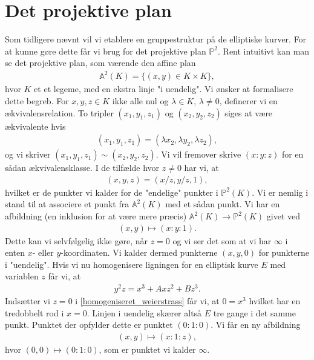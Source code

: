 \section{Det projektive plan}
Som tidligere nævnt vil vi etablere en gruppestruktur på de elliptiske
kurver. For at kunne gøre dette får vi brug for det projektive plan 
$\mathbb{P}^2$. Rent intuitivt kan man se det projektive plan, som
værende den affine plan 
\begin{align*}
	\mathbb{A}^2(K) = \{ (x, y) \in K \times K \},
\end{align*}
hvor $K$ et et legeme, med en ekstra linje "i uendelig". 
Vi ønsker at formalisere dette begreb. 
For $x, y, z \in K$ ikke alle nul og $\lambda \in K$, $\lambda \neq 0$, 
definerer vi en ækvivalensrelation. To tripler $(x_1, y_1, z_1)$ og 
$(x_2, y_2, z_2)$ siges at være ækvivalente hvis 
\begin{align*}
	(x_1, y_1, z_1) = (\lambda x_2, \lambda y_2, \lambda z_2),
\end{align*}
og vi skriver $(x_1, y_1, z_1) \sim (x_2, y_2, z_2)$. Vi vil fremover skrive
$(x:y:z)$ for en sådan ækvivalensklasse. I de tilfælde hvor $z \neq 0$ har vi, at
\begin{align*}
	(x, y, z) = (x/z, y/z, 1),
\end{align*}
hvilket er de punkter vi kalder for de "endelige" punkter i $\mathbb{P}^2(K)$.
Vi er nemlig i stand til at associere et punkt fra $\mathbb{A}^2(K)$ med et sådan
punkt. Vi har en afbildning (en inklusion for at være mere præcis) 
$\mathbb{A}^2(K) \to \mathbb{P}^2(K)$ givet ved
\begin{align*}
	(x, y) \mapsto (x : y : 1).
\end{align*}
Dette kan vi selvfølgelig ikke gøre, når $z=0$ og vi ser det som at vi
har $\infty$ i enten $x$- eller $y$-koordinaten. Vi kalder dermed punkterne
$(x, y, 0)$ for punkterne i "uendelig".
Hvis vi nu homogenisere ligningen for en elliptisk kurve $E$ med variablen $z$ får vi, at
\begin{align}
\label{homogeniseret_weierstrass}
	y^2 z = x^3 + Ax z^2 + B z^3.
\end{align} 
Indsætter vi $z=0$ i \eqref{homogeniseret_weierstrass} får vi, at $0 = x^3$ hvilket har en tredobbelt rod i $x=0$. Linjen i uendelig skærer altså $E$ tre gange i det samme punkt. Punktet der opfylder dette er punktet $(0 : 1 : 0)$. Vi får en ny afbildning
\begin{align*}
	(x, y) \mapsto (x : 1 : z),
\end{align*}
hvor $(0, 0) \mapsto (0 : 1 : 0)$, som er punktet vi kalder $\infty$.





